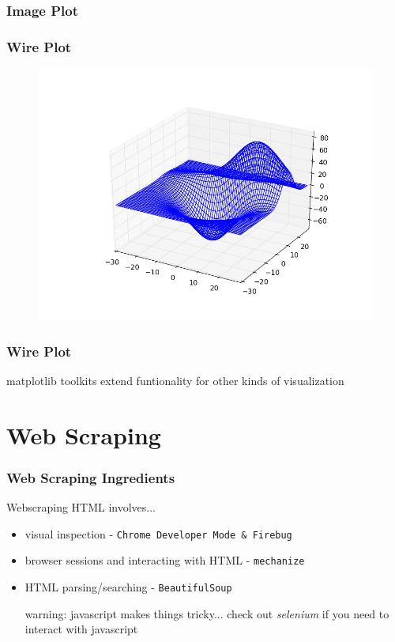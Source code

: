 \documentclass{beamer}
\begin{document}
\begin{frame}
\frametitle{Image Plot}
\end{frame}

\begin{frame}
\frametitle{Wire Plot}
\begin{figure}[h]
\centering
\includegraphics[width=.9\textwidth]{images/wire.png}
\end{figure}
\end{frame}

\begin{frame}
\frametitle{Wire Plot}
matplotlib toolkits extend funtionality for other kinds of visualization
\end{frame}

\section{Web Scraping}

\begin{frame}
\frametitle{Web Scraping Ingredients}
Webscraping HTML involves...
\vspace{0.2in}
\begin{itemize}
\setlength{\itemsep}{0.1in}
\item{visual inspection - \texttt{Chrome Developer Mode \& Firebug}}
\item{browser sessions and interacting with HTML - \texttt{mechanize}}
\item{HTML parsing/searching - \texttt{BeautifulSoup}}
\vspace{0.2in}

warning: javascript makes things tricky... check out \textit{selenium} if you need to interact with javascript
\end{itemize}
\end{frame}
\end{document}
